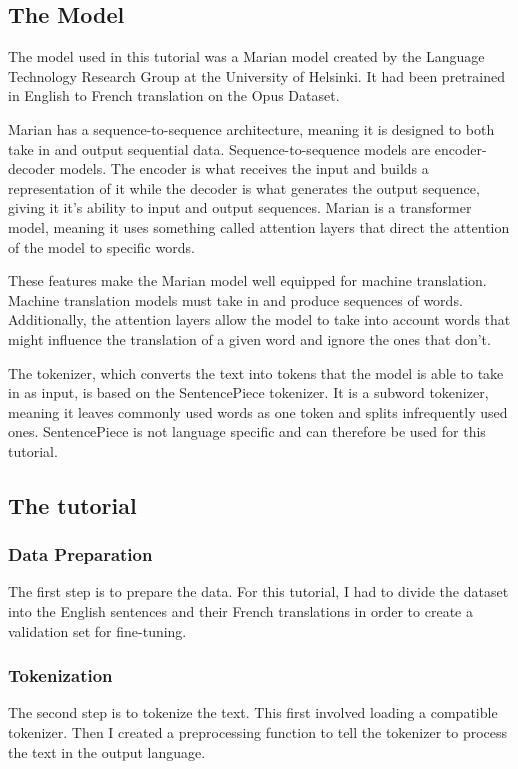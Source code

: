 \documentclass[10pt,twocolumn]{article}
\begin{document}
\subsection{The Model}
The model used in this tutorial was a Marian model created by the Language Technology Research Group at the University of Helsinki. It had been pretrained in English to French translation on the Opus Dataset. 

Marian has a sequence-to-sequence architecture, meaning it is designed to both take in and output sequential data. Sequence-to-sequence models are encoder-decoder models. The encoder is what receives the input and builds a representation of it while the decoder is what generates the output sequence, giving it it's ability to input and output sequences. Marian is a transformer model, meaning it uses something called attention layers that direct the attention of the model to specific words. 

These features make the Marian model well equipped for machine translation. Machine translation models must take in and produce sequences of words. Additionally, the attention layers allow the model to take into account words that might influence the translation of a given word and ignore the ones that don't. 

The tokenizer, which converts the text into tokens that the model is able to take in as input, is based on the SentencePiece tokenizer. It is a subword tokenizer, meaning it leaves commonly used words as one token and splits infrequently used ones. SentencePiece is not language specific and can therefore be used for this tutorial.

\subsection{The tutorial}

\subsubsection{Data Preparation}
\hspace{\parindent}The first step is to prepare the data. For this tutorial, I had to divide the dataset into the English sentences and their French translations in order to create a validation set for fine-tuning. 

\subsubsection{Tokenization}
\hspace{\parindent}The second step is to tokenize the text. This first involved loading a compatible tokenizer. Then I created a preprocessing function to tell the tokenizer to process the text in the output language.
\end{document}
